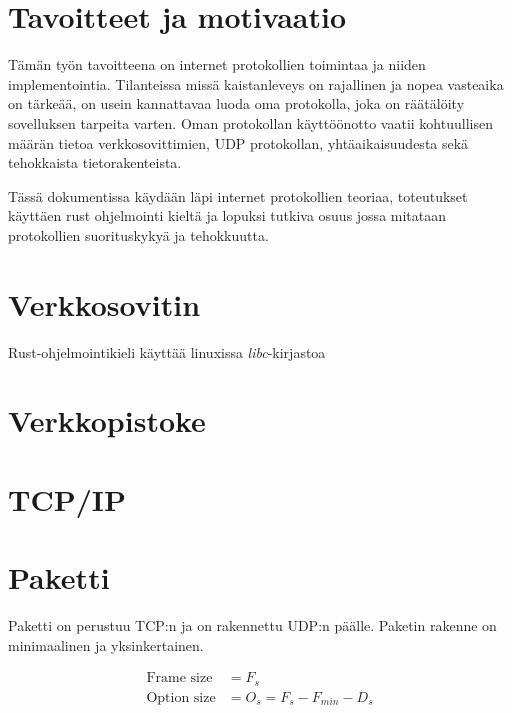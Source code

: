 \documentclass[a4paper,12pt]{article}
\begin{document}
    

    \section{Tavoitteet ja motivaatio}
    Tämän työn tavoitteena on internet protokollien toimintaa ja niiden implementointia. Tilanteissa missä kaistanleveys on rajallinen ja nopea vasteaika on tärkeää, on usein kannattavaa luoda oma protokolla, joka on räätälöity sovelluksen tarpeita varten.
    Oman protokollan käyttöönotto vaatii kohtuullisen määrän tietoa verkkosovittimien, UDP protokollan, yhtäaikaisuudesta sekä tehokkaista tietorakenteista.\par
    Tässä dokumentissa käydään läpi internet protokollien teoriaa, toteutukset käyttäen rust ohjelmointi kieltä ja lopuksi tutkiva osuus jossa mitataan protokollien suorituskykyä ja tehokkuutta.


    \section{Verkkosovitin}\label{sec:verkkosovitin}
    Rust-ohjelmointikieli käyttää linuxissa \textit{libc}-kirjastoa \cite{rust-source-unix-netrs}

    \section{Verkkopistoke}\label{sec:verkkopistoke}
    \blindtext


    \section{TCP/IP}\label{sec:tcpip}
    \blindtext

    \section{Paketti}\label{sec:paketti}
    Paketti on perustuu TCP:n ja on rakennettu UDP:n päälle. Paketin rakenne on minimaalinen ja yksinkertainen.

\begin{align}
    \text{Frame size} &= F_s \\
    \text{Option size} &= O_s = F_s - F_{min} - D_s 
\end{align}
\end{document}
